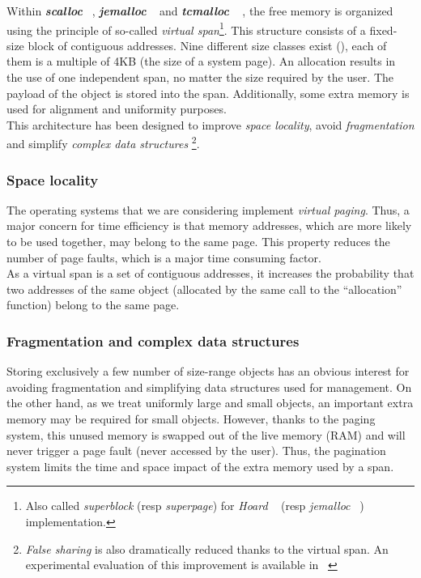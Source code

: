 \documentclass[10pt]{article}											%
\begin{document}
Within \textbf{\textit{scalloc}} ~\cite{scalloc_aigner}, \textbf{\textit{jemalloc}} ~\cite{jemalloc_evans} and \textbf{\textit{tcmalloc}} ~\cite{tcmalloc_ghemawat} , the free memory is organized using the principle of so-called \emph{virtual span}\footnote{Also called \emph{superblock} (resp \emph{superpage}) for \emph{Hoard} ~\cite{hoard_berger} (resp \emph{jemalloc} ~\cite{jemalloc_evans}) implementation.}.   This structure consists of a fixed-size block of contiguous addresses.   Nine different size classes exist (), each of them is a multiple of 4KB (the size of a system page).   An allocation results in the use of one independent span, no matter the size required by the user. 
The payload of the object is stored into the span.   Additionally, some extra memory is used for alignment and uniformity purposes.\\

This architecture has been designed to improve \emph{space locality}, avoid \emph{fragmentation} and simplify \emph{complex data structures} \footnote{\emph{False sharing} is also dramatically reduced thanks to the virtual span.   An experimental evaluation of this improvement is available in ~\cite{scalloc_aigner}}.



\subsubsection{Space locality}
The operating systems that we are considering implement \emph{virtual paging}.   Thus, a major concern for time efficiency is that memory addresses, which are more likely to be used together, may belong to the same page.   This property reduces the number of page faults, which is a major time consuming factor.\\
As a virtual span is a set of contiguous addresses, it increases the probability that two addresses of the same object (allocated by the same call to the “allocation” function) belong to the same page.



\subsubsection{Fragmentation and complex data structures}
Storing exclusively a few number of size-range objects has an obvious interest for avoiding fragmentation and simplifying data structures used for management.   On the other hand, as we treat uniformly large and small objects, an important extra memory may be required for small objects.   However, thanks to the paging system, this unused memory is swapped out of the live memory (RAM) and will never trigger a page fault (never accessed by the user).   Thus, the pagination system limits the time and space impact of the extra memory used by a span.
\end{document}
